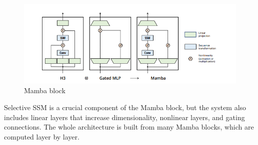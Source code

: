 \documentclass[conference]{IEEEtran}
\begin{document}
\begin{figure}[!htbp]
    \centering \includegraphics[width=\linewidth]{../assets/Mamba.png}
    \caption{Mamba block \cite{mamba}}
    \label{fig:mamba}
\end{figure}

Selective SSM is a crucial component of the Mamba block, but the system also includes linear layers that increase dimensionality, nonlinear layers, and gating connections.
The whole architecture is built from many Mamba blocks, which are computed layer by layer.


\begin{table}[t] \centering
    \caption{Model comparison \cite{mamba}}
    \label{tab:comparison}

\end{table}
\end{document}

